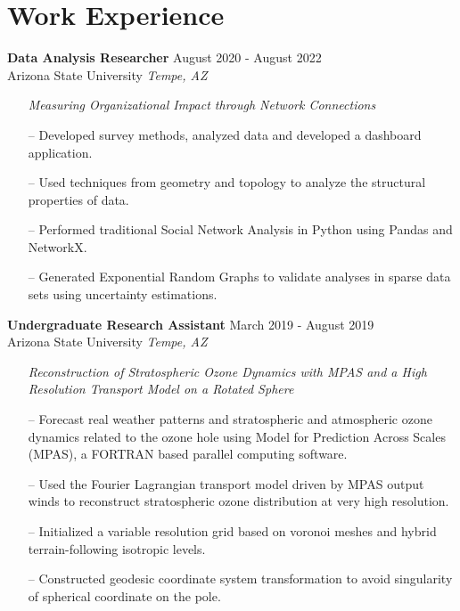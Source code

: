 \documentclass[a4paper,12pt]{article}
\begin{document}
\section{Work Experience}
\vspace{-.4em}
\textbf{Data Analysis Researcher} \hfill August 2020 - August 2022\\
Arizona State University \hfill \textit{Tempe, AZ} 
\vspace{-.5em}
 \begin{itemize}[nosep,after=\strut, leftmargin=1em, itemsep=3pt]
    \item[] \footnotesize\textit{Measuring Organizational Impact through Network Connections}\small
    \item[--] Developed survey methods, analyzed data and developed a dashboard application.
    \item[--] Used techniques from geometry and topology to analyze the structural properties of data.
    \item[--] Performed traditional Social Network Analysis in Python using Pandas and NetworkX.
    \item[--] Generated Exponential Random Graphs to validate analyses in sparse data sets using uncertainty estimations. 
 \end{itemize} \normalsize
 \vspace{-1.2em}
\textbf{Undergraduate Research Assistant} \hfill  March 2019 - August 2019\\
Arizona State University \hfill \textit{Tempe, AZ}\hspace{-.3em}
\vspace{-.5em}
 \begin{itemize}[nosep,after=\strut, leftmargin=1em, itemsep=3pt]
    \item[] \footnotesize\textit{Reconstruction of Stratospheric Ozone Dynamics with MPAS and a High Resolution Transport Model on a Rotated Sphere}\small
    \item[--] Forecast real weather patterns and stratospheric and atmospheric ozone dynamics related to the ozone hole using Model for Prediction Across Scales (MPAS), a FORTRAN based parallel computing software.  
    \item[--] Used the Fourier Lagrangian transport model driven by MPAS output winds to reconstruct stratospheric ozone distribution at very high resolution.
    \item[--] Initialized a variable resolution grid based on voronoi meshes and hybrid terrain-following isotropic levels.
    \item[--] Constructed geodesic coordinate system transformation to avoid singularity of spherical coordinate on the pole.
 \end{itemize}
\end{document}
